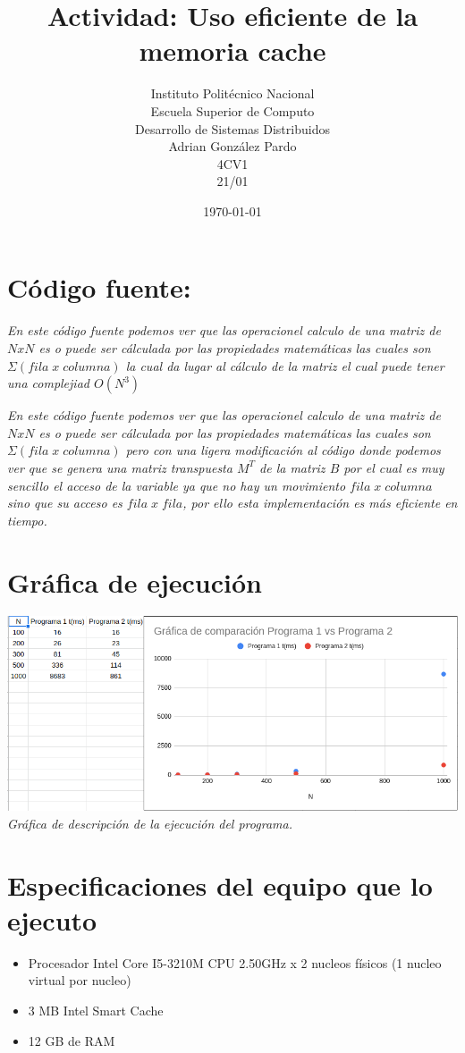 \documentclass[10pt,executivepaper]{article}
\title{Actividad: Uso eficiente de la memoria cache}
\author{Instituto Politécnico Nacional\\Escuela Superior de Computo\\Desarrollo de Sistemas Distribuidos\\Adrian González Pardo\\4CV1\\21/01}
\date{\today}
\begin{document}
\maketitle
\section{Código fuente:}
\begin{center}
  
  \textit{En este código fuente podemos ver que las operacionel calculo de una matriz de $NxN$ es o puede ser cálculada por las propiedades matemáticas las cuales son $\Sigma(fila\;x\;columna)$ la cual da lugar al cálculo de la matriz el cual puede tener una complejiad $O(N^3)$}
  
  \textit{En este código fuente podemos ver que las operacionel calculo de una matriz de $NxN$ es o puede ser cálculada por las propiedades matemáticas las cuales son $\Sigma(fila\;x\;columna)$ pero con una ligera modificación al código donde podemos ver que se genera una matriz transpuesta $M^T$ de la matriz $B$ por el cual es muy sencillo el acceso de la variable ya que no hay un movimiento $fila\;x\;columna$ sino que su acceso es $fila\;x\;fila$, por ello esta implementación es más eficiente en tiempo.}
\end{center}
\section{Gráfica de ejecución}
\begin{center}
  \includegraphics[scale=0.5]{imgs/grafica.png}
  \\\textit{Gráfica de descripción de la ejecución del programa.}
\end{center}
\section{Especificaciones del equipo que lo ejecuto}
\begin{itemize}
  \item Procesador Intel Core I5-3210M CPU 2.50GHz x 2 nucleos físicos (1 nucleo virtual por nucleo)
  \item 3 MB Intel Smart Cache
  \item 12 GB de RAM
\end{itemize}
\end{document}
